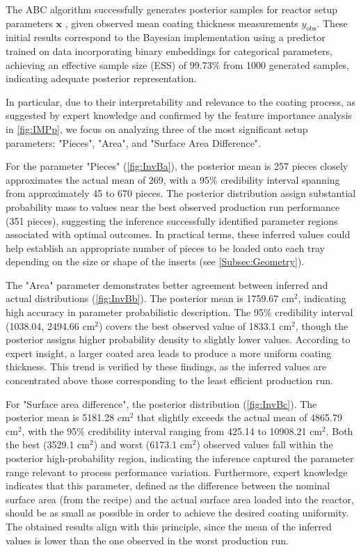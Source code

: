 \documentclass{article}
\begin{document}
	The ABC algorithm successfully generates posterior samples for reactor setup parameters $\bm{x}$ , given observed mean coating thickness measurements $y_\text{obs}$. These initial results correspond to the Bayesian implementation using a predictor trained on data incorporating binary embeddings for categorical parameters, achieving an effective sample size (ESS) of 99.73\% from 1000 generated samples, indicating adequate posterior representation. 
	
	In particular, due to their interpretability and relevance to the coating process, as suggested by expert knowledge and confirmed by the feature importance analysis in \cref{fig:IMPp}, we focus on analyzing three of the most significant setup parameters: "Pieces", "Area", and "Surface Area Difference".
	
	For the parameter "Pieces" (\cref{fig:InvBa}),  the posterior mean is 257 pieces closely approximates the actual mean of 269, with a 95\% credibility interval spanning from approximately 45 to 670 pieces. The posterior distribution assign substantial probability mass to values near the best observed production run performance (351 pieces), suggesting the inference successfully identified parameter regions associated with optimal outcomes. 
	In practical terms, these inferred values could help establish an appropriate number of pieces to be loaded onto each tray depending on the size or shape of the inserts (see \cref{Subsec:Geometry}).
	
	The "Area" parameter demonstrates better agreement between inferred and actual distributions (\cref{fig:InvBb}). The posterior mean is 1759.67 cm$^2$, indicating high accuracy in parameter probabilistic description. The 95\% credibility interval (1038.04, 2494.66 cm$^2$) covers the best observed value of 1833.1 cm$^2$, though the posterior assigns higher probability density to slightly lower values. According to expert insight, a larger coated area leads to produce a more uniform coating thickness. This trend is verified by these findings, as the inferred values are concentrated above those corresponding to the least efficient production run.
	
	For "Surface area difference", the posterior distribution (\cref{fig:InvBc}). The posterior mean is 5181.28 cm$^2$ that slightly exceeds the actual mean of 4865.79 cm$^2$, with the 95\% credibility interval ranging from 425.14 to 10908.21 cm$^2$. Both the best (3529.1 cm$^2$) and worst (6173.1 cm$^2$) observed values fall within the posterior high-probability region, indicating the inference captured the parameter range relevant to process performance variation. Furthermore, expert knowledge indicates that this parameter, defined as the difference between the nominal surface area (from the recipe) and the actual surface area loaded into the reactor, should be as small as possible in order to achieve the desired coating uniformity. The obtained results align with this principle, since the mean of the inferred values is lower than the one observed in the worst production run.
	
\end{document}
